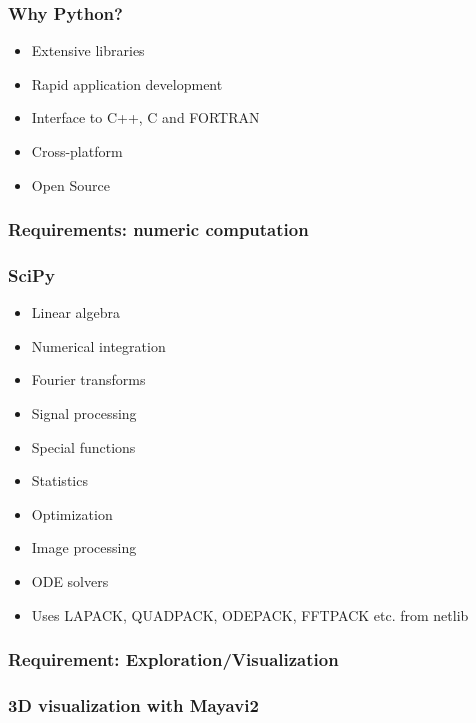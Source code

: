 \documentclass[14pt,compress]{beamer}
\begin{document}
\begin{frame}[plain]
  \frametitle{Why Python?}
  \Large
  \begin{itemize}
  \item Extensive libraries
  \item Rapid application development
  \item Interface to C++, C and FORTRAN
  \item Cross-platform
  \item Open Source
  \end{itemize}
\end{frame}


\begin{frame}[plain]
  \frametitle{Requirements: numeric computation}

    \begin{center}

    \end{center}

\end{frame}

\begin{frame}[plain]
  \frametitle{SciPy}
  \begin{itemize}
  \item Linear algebra
  \item Numerical integration
  \item Fourier transforms
  \item Signal processing
  \item Special functions
  \item Statistics
  \item Optimization
  \item Image processing
  \item ODE solvers
    \vspace*{0.2in}
  \item Uses LAPACK, QUADPACK, ODEPACK, FFTPACK etc. from netlib
  \end{itemize}
\end{frame}

\begin{frame}[plain]
    \frametitle{Requirement: Exploration/Visualization}
    \begin{center}
    \end{center}
  \end{frame}

\begin{frame}[plain]
  \frametitle{3D visualization with Mayavi2}
      \vspace*{-0.3in}
  \begin{center}
    \hspace*{-0.3in}
  \end{center}
\end{frame}
\end{document}
